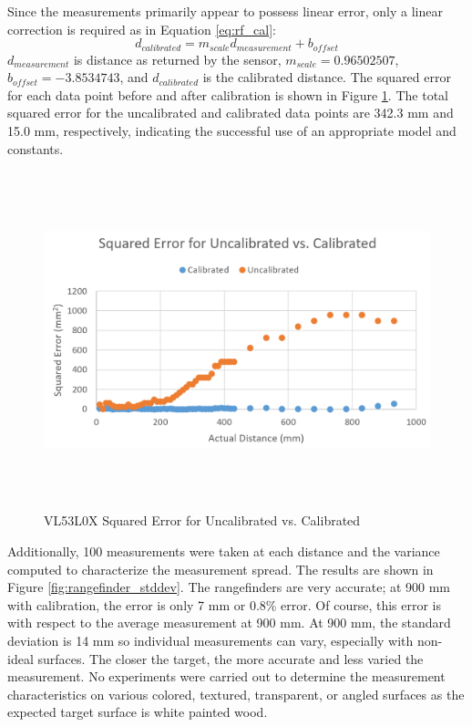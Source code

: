 Since the measurements primarily appear to possess linear error, only a linear correction is required as in Equation \ref{eq:rf_cal}:
\begin{equation}
\label{eq:rf_cal}
	d_{calibrated} = m_{scale} d_{measurement} + b_{offset}
\end{equation}
$d_{measurement} $ is distance as returned by the sensor, $m_{scale} = 0.96502507$, $b_{offset} = -3.8534743$, and $d_{calibrated}$ is the calibrated distance. The squared error for each data point before and after calibration is shown in Figure \ref{fig:rangefinder_calibrated}. The total squared error for the uncalibrated and calibrated data points are 342.3 mm and 15.0 mm, respectively, indicating the successful use of an appropriate model and constants.
\begin{figure}[H]   %
	\centering \includegraphics[width=6in, height=3.85in, keepaspectratio]{figures/rangefinder_calibrated.png}
	\caption{VL53L0X Squared Error for Uncalibrated vs. Calibrated}\label{fig:rangefinder_calibrated}
\end{figure}
Additionally, 100 measurements were taken at each distance and the variance computed to characterize the measurement spread. The results are shown in Figure \ref{fig:rangefinder_stddev}. The rangefinders are very accurate; at 900 mm with calibration, the error is only 7 mm or 0.8\% error. Of course, this error is with respect to the average measurement at 900 mm. At 900 mm, the standard deviation is 14 mm so individual measurements can vary, especially with non-ideal surfaces. The closer the target, the more accurate and less varied the measurement. No experiments were carried out to determine the measurement characteristics on various colored, textured, transparent, or angled surfaces as the expected target surface is white painted wood.
